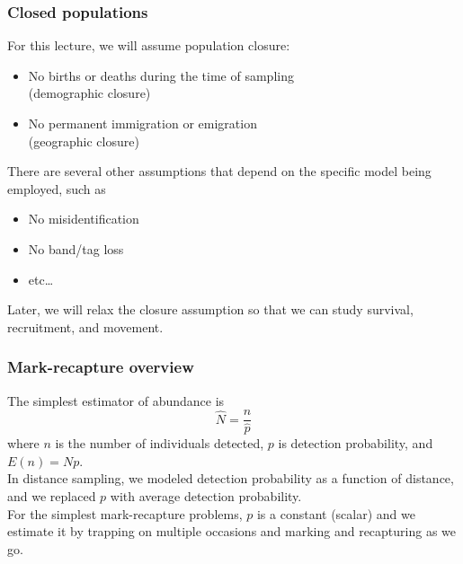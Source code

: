 \documentclass[color=usenames,dvipsnames]{beamer}\usepackage[]{graphicx}\usepackage[]{color}
\begin{document}
\begin{frame}
  \frametitle{Closed populations}
  For this lecture, we will assume population closure:
  \begin{itemize}
    \item No births or deaths during the time of sampling \\ (demographic
      closure)
    \item No permanent immigration or emigration \\ (geographic closure)
  \end{itemize}
  \pause
  \vfill
  There are several other assumptions that depend on the specific
  model being employed, such as
  \begin{itemize}
    \item No misidentification
    \item No band/tag loss
    \item etc\dots
  \end{itemize}
  \pause
  \vfill
  Later, we will relax the closure assumption so that we can study
  survival, recruitment, and movement.
\end{frame}



\begin{frame}
  \frametitle{Mark-recapture overview}
  The simplest estimator of abundance is 
  \[
    \hat{N} = \frac{n}{\hat{p}}
  \]
  where $n$ is the number of individuals detected, $p$ is detection
  probability, and $E(n)=Np$. \\
  \pause
  \vfill
  In distance sampling, we modeled detection probability as a
  function of distance, and we replaced $p$ with average detection
  probability. \\ 
  \pause
  \vfill
  For the simplest mark-recapture problems, $p$ is a constant (scalar) and we
  estimate it by trapping on multiple occasions and marking and
  recapturing as we go.  
\end{frame}
\end{document}
